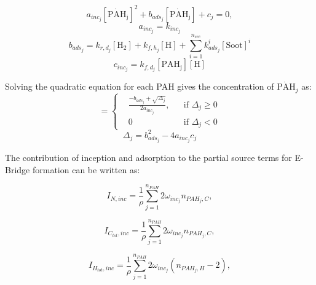 
\begin{equation}
	a_{inc_j}[\mathrm{\dot{PAH}_j}]^2+
	b_{ads_j}[\mathrm{\dot{PAH}_j}] + c_j = 0,
\end{equation}
\begin{equation}
	a_{inc_j}=k_{inc_j}
\end{equation}
\begin{equation}
	b_{ads_j}=k_{r,d_j}[\mathrm{H_2}]+k_{f,h_j}[\mathrm{H}]+\sum_{i=1}^{n_{sec}}k^i_{ads_j}[\mathrm{Soot}]^i
\end{equation}
\begin{equation}
	c_{inc_j}=k_{f,d_j}[\mathrm{PAH_j}][\mathrm{H}]
\end{equation}

Solving the quadratic equation for each PAH gives the concentration of $\mathrm{\mathrm{\dot{PAH}}}_j$ as:
\begin{equation}
	[\mathrm{\mathrm{\dot{PAH}}_j}]=
	\left\{
	\begin{aligned}
		&\frac{-b_{ads_j}+\sqrt{\Delta_j}}{2a_{inc_j}},
		&&
		\text{if } \Delta_j \ge 0
		\\
		& 0 
		&&
		\text{if } \Delta_j < 0
	\end{aligned}
	\right.
	\label{eqn:rad_ebri}
\end{equation}
\begin{equation}
	\Delta_j = b_{ads_j}^2-4a_{inc_j}c_{j}
	\label{eqn:delta_ebri}
\end{equation}

The contribution of inception and adsorption to the partial source terms for E-Bridge formation can be written as:

\begin{equation}
	I_{N,{inc}} = \frac{1}{\rho}
	\sum_{j=1}^{n_{PAH}}
	2\omega_{inc_{j}} 
	n_{PAH_j,C}
	\label{eqn:IN_inc_ebri},
\end{equation}

\begin{equation}
	I_{C_{tot},{inc}} = \frac{1}{\rho}
	\sum_{j=1}^{n_{PAH}}
	2\omega_{inc_{j}} 
	n_{PAH_j,C}
	\label{eqn:ICtot_inc_ebri},
\end{equation}

\begin{equation}
	I_{H_{tot},{inc}} = \frac{1}{\rho}
	\sum_{j=1}^{n_{PAH}}
	2\omega_{inc_{j}} 
	\left(
	n_{PAH_j,H}-2
	\right)
	\label{eqn:IHtot_inc_ebri},
\end{equation}


